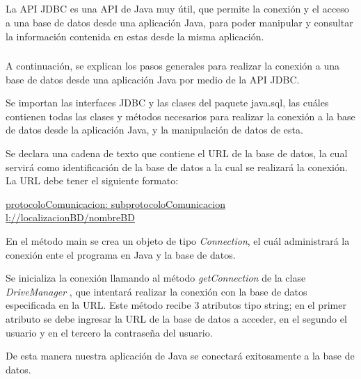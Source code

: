 \documentclass[10pt,a4paper]{article} %
\begin{document}
	\subsection{}
	{\large La API JDBC es una API de Java muy {\' u}til, que permite la conexi{\' o}n y el acceso a una base de datos desde una aplicaci{\' o}n Java, para poder manipular y consultar la informaci{\' o}n contenida en estas desde la misma aplicaci{\' o}n.
	}
	
	\subsubsection{}
	{\large A continuaci{\' o}n, se explican los pasos generales para realizar la conexi{\' o}n a una base de datos desde una aplicaci{\' o}n Java por medio de la API JDBC.
		
		\begin{enumerate}       
			{\large     
				\item Se importan las interfaces JDBC y las clases del paquete java.sql, las cu{\' a}les contienen todas las clases y métodos necesarios para realizar la conexi{\' o}n a la base de datos desde la aplicaci{\' o}n Java, y la manipulaci{\' o}n de datos de esta.
				\item Se declara una cadena de texto que contiene el URL de la base de datos, la cual servir{\' a} como identificaci{\' o}n de la base de datos a la cual se realizar{\' a} la conexi{\' o}n. La URL debe tener el siguiente formato: 
				
				\underline{protocoloComunicacion: subprotocoloComunicacion l://localizacionBD/nombreBD }
				\item En el método main se crea un objeto de tipo \textit{Connection}, el cu{\' a}l administrar{\' a} la conexi{\' o}n ente el programa en Java y la base de datos. 
				\item Se inicializa la conexi{\' o}n llamando al método \textit{getConnection} de la clase \textit{DriveManager }, que intentar{\' a} realizar la conexi{\' o}n con la base de datos especificada en la URL. Este método recibe 3 atributos tipo string; en el primer atributo se debe ingresar la URL de la base de datos a acceder, en el segundo el usuario y en el tercero la contrase{\~n}a del usuario.
			}
		\end{enumerate}
		
		De esta manera nuestra aplicaci{\' o}n de Java se conectar{\' a} exitosamente a la base de datos.
	}
	
\end{document}
